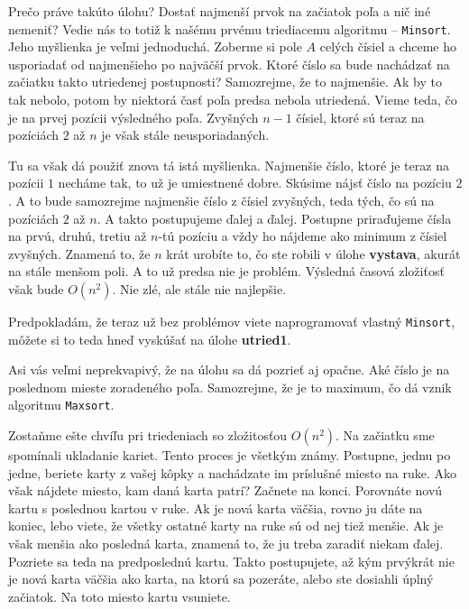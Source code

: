 \medskip

Prečo práve takúto úlohu? Dostať najmenší prvok na začiatok poľa a nič iné nemeniť? Vedie nás to
totiž k našému prvému triediacemu algoritmu -- \texttt{Minsort}. Jeho myšlienka je veľmi jednoduchá.
Zoberme si pole $A$ celých čísiel a chceme ho usporiadať od najmenšieho po najväčší prvok. Ktoré
číslo sa bude nachádzať na začiatku takto utriedenej postupnosti? Samozrejme, že to najmenšie. Ak by
to tak nebolo, potom by niektorá časť poľa predsa nebola utriedená. Vieme teda, čo je na prvej
pozícii výsledného poľa. Zvyšných $n-1$ čísiel, ktoré sú teraz na pozíciách $2$ až $n$ je však stále
neusporiadaných.

Tu sa však dá použiť znova tá istá myšlienka. Najmenšie číslo, ktoré je teraz na pozícii $1$ necháme
tak, to už je umiestnené dobre. Skúsime nájsť číslo na pozíciu $2$. A to bude samozrejme najmenšie
číslo z čísiel zvyšných, teda tých, čo sú na pozíciách $2$ až $n$. A takto postupujeme ďalej a
ďalej. Postupne priraďujeme čísla na prvú, druhú, tretiu až $n$-tú pozíciu a vždy ho nájdeme ako
minimum z čísiel zvyšných. Znamená to, že $n$ krát urobíte to, čo ste robili v úlohe
\textbf{vystava}, akurát na stále menšom poli. A to už predsa nie je problém.
Výsledná časová zložiťosť však bude $O(n^2)$. Nie zlé, ale stále nie najlepšie.

\medskip

Predpokladám, že teraz už bez problémov viete naprogramovať vlastný \texttt{Minsort}, môžete si to
teda hneď vyskúšať na úlohe \textbf{utried1}.

\medskip

Asi vás veľmi neprekvapivý, že na úlohu sa dá pozrieť aj opačne. Aké číslo je na poslednom mieste
zoradeného poľa. Samozrejme, že je to maximum, čo dá vznik algoritmu \texttt{Maxsort}.

\bigskip

Zostaňme ešte chvíľu pri triedeniach so zložitosťou $O(n^2)$. Na začiatku sme spomínali ukladanie
kariet. Tento proces je všetkým známy. Postupne, jednu po jedne, beriete karty z vašej kôpky a
nachádzate im príslušné miesto na ruke. Ako však nájdete miesto, kam daná karta patrí? Začnete na
konci. Porovnáte novú kartu s poslednou kartou v ruke. Ak je nová karta väčšia, rovno ju dáte na
koniec, lebo viete, že všetky ostatné karty na ruke sú od nej tiež menšie. Ak je však menšia ako
posledná karta, znamená to, že ju treba zaradiť niekam ďalej. Pozriete sa teda na predposlednú
kartu. Takto postupujete, až kým prvýkrát nie je nová karta väčšia ako karta, na ktorú sa pozeráte,
alebo ste dosiahli úplný začiatok. Na toto miesto kartu vsuniete.

